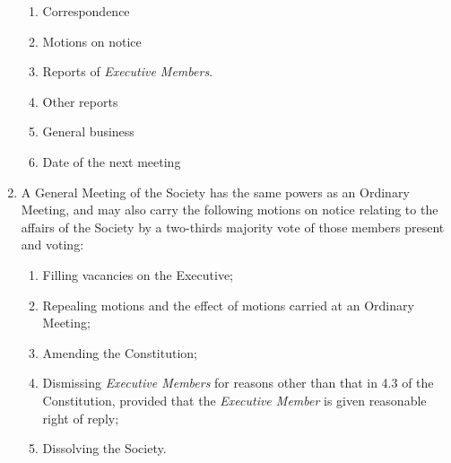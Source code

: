 \documentclass[11pt]{article}
\begin{document}
\begin{enumerate}[\thesection .1]
\begin{enumerate}[\hspace{5mm}1.]
    	\item Correspondence
    	\item Motions on notice
    	\item Reports of \textit{Executive Members}.
    	\item Other reports
    	\item General business
    	\item Date of the next meeting
    \end{enumerate}
    \item A General Meeting of the Society has the same powers as an Ordinary Meeting, and may also carry the following motions on notice relating to the affairs of the Society by a two-thirds majority vote of those members present and voting:
    \begin{enumerate}
        \item Filling vacancies on the Executive;
        \item Repealing motions and the effect of motions carried at an Ordinary Meeting;
        \item Amending the Constitution;
        \item Dismissing \textit{Executive Members} for reasons other than that in 4.3 of the Constitution, provided that the \textit{Executive Member} is given reasonable right of reply;
        \item Dissolving the Society.
    \end{enumerate}
\end{enumerate}
\end{document}
